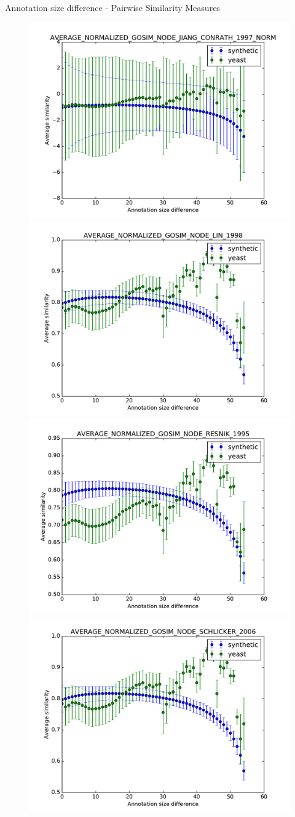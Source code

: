 \documentclass{beamer}
\begin{document}
\begin{frame}{Annotation size difference - Pairwise Similarity Measures}
\begin{figure}
\includegraphics[width=0.5\linewidth, height=0.4\textheight]{pairwise_diff/SIM_GROUPWISE_AVERAGE_NORMALIZED_GOSIM_SIM_PAIRWISE_DAG_NODE_JIANG_CONRATH_1997_NORM_diff.pdf}
\includegraphics[width=0.5\linewidth, height=0.4\textheight]{pairwise_diff/SIM_GROUPWISE_AVERAGE_NORMALIZED_GOSIM_SIM_PAIRWISE_DAG_NODE_LIN_1998_diff.pdf} \\
\includegraphics[width=0.5\linewidth, height=0.4\textheight]{pairwise_diff/SIM_GROUPWISE_AVERAGE_NORMALIZED_GOSIM_SIM_PAIRWISE_DAG_NODE_RESNIK_1995_diff.pdf}
\includegraphics[width=0.5\linewidth, height=0.4\textheight]{pairwise_diff/SIM_GROUPWISE_AVERAGE_NORMALIZED_GOSIM_SIM_PAIRWISE_DAG_NODE_SCHLICKER_2006_diff.pdf}
\end{figure}
\end{frame}
\end{document}
